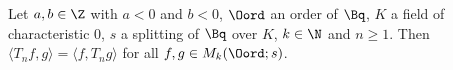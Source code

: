 Let $a,b\in\Z$ with $a<0$ and $b<0$, $\Oord$ an order of $\Bq$, $K$ a field of characteristic $0$, $s$ a splitting of $\Bq$ over $K$, $k\in\N$
and $n\ge1$. Then $\langle T_nf,g\rangle=\langle f,T_ng\rangle$ for all $f,g\in M_k(\Oord;s)$.

